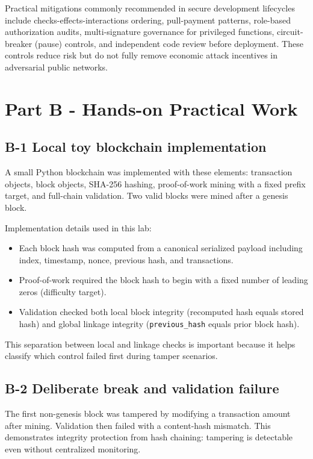 \documentclass[10pt,a4paper]{article}
\begin{document}
Practical mitigations commonly recommended in secure development lifecycles include checks-effects-interactions ordering, pull-payment patterns, role-based authorization audits, multi-signature governance for privileged functions, circuit-breaker (pause) controls, and independent code review before deployment. These controls reduce risk but do not fully remove economic attack incentives in adversarial public networks.

\section*{Part B - Hands-on Practical Work}

\subsection*{B-1 Local toy blockchain implementation}
A small Python blockchain was implemented with these elements: transaction objects, block objects, SHA-256 hashing, proof-of-work mining with a fixed prefix target, and full-chain validation. Two valid blocks were mined after a genesis block.

Implementation details used in this lab:
\begin{itemize}
	\item Each block hash was computed from a canonical serialized payload including index, timestamp, nonce, previous hash, and transactions.
	\item Proof-of-work required the block hash to begin with a fixed number of leading zeros (difficulty target).
	\item Validation checked both local block integrity (recomputed hash equals stored hash) and global linkage integrity (\texttt{previous\_hash} equals prior block hash).
\end{itemize}

This separation between local and linkage checks is important because it helps classify which control failed first during tamper scenarios.

\subsection*{B-2 Deliberate break and validation failure}
The first non-genesis block was tampered by modifying a transaction amount after mining. Validation then failed with a content-hash mismatch. This demonstrates integrity protection from hash chaining: tampering is detectable even without centralized monitoring.
\end{document}
